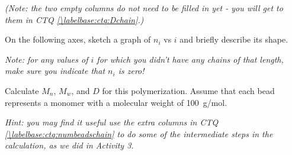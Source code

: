 \begin{activity}
\begin{ctqs}
		\emph{(Note: the two empty columns do not need to be filled in yet - you will get to them in CTQ \ref{\labelbase:ctq:Dchain}.)}
		
	\question On the following axes, sketch a graph of $n_i$ vs $i$ and briefly describe its shape. \label{\labelbase:ctq:MWDchain}
	
		\emph{Note: for any values of $i$ for which you didn't have any chains of that length, make sure you indicate that $n_i$ is zero!}
	
		\begin{solution}[2.5in]\end{solution}
	
	\question Calculate $M_n$, $M_w$, and $D$ for this polymerization.  Assume that each bead represents a monomer with a molecular weight of 100~g/mol. \label{\labelbase:ctq:Dchain}
	
		\emph{Hint: you may find it useful use the extra columns in CTQ \ref{\labelbase:ctq:numbeadschain} to do some of the intermediate steps in the calculation, as we did in Activity 3.}
	
		\begin{solution}[2.5in]\end{solution}
	

\end{ctqs}
\end{activity}
